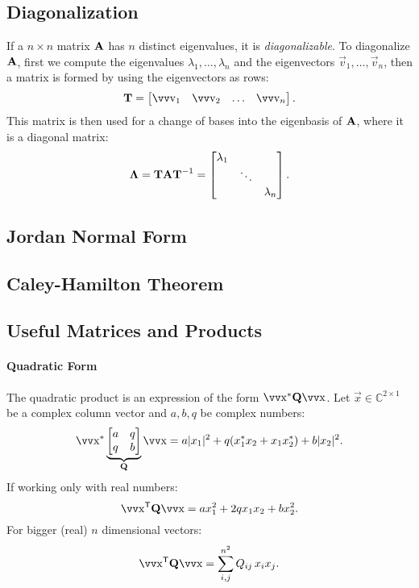 \subsection{Diagonalization}

If a \(n \times n\) matrix \(\bm{\mathrm{A}}\) has \(n\) distinct eigenvalues, it is \emph{diagonalizable}. To diagonalize \(\bm{\mathrm{A}}\), first we compute the eigenvalues \(\lambda_1, \ldots, \lambda_n\) and the eigenvectors \(\vec{v}_1, \ldots, \vec{v}_n\), then a matrix is formed by using the eigenvectors as rows:
\[
	\mx{T} = \begin{bmatrix}
		\vec{v}_1 & \vec{v}_2 & \dots & \vec{v}_n
	\end{bmatrix}.
\]
This matrix is then used for a change of bases into the eigenbasis of \(\bm{\mathrm{A}}\), where it is a diagonal matrix:
\[
	\bm{\mathrm{\Lambda}} = \bm{\mathrm{T}} \bm{\mathrm{A}} \bm{\mathrm{T}}^{-1} = \begin{bmatrix}
		\lambda_1 \\
		& \ddots \\
		& & \lambda_n
	\end{bmatrix}.
\]

\subsection{Jordan Normal Form}

\subsection{Caley-Hamilton Theorem}

\subsection{Useful Matrices and Products}

\paragraph{Quadratic Form}

The quadratic product is an expression of the form \(\vec{x}^* \mx{Q} \vec{x}\). Let \(\vec{x} \in \mathbb{C}^{2\times 1}\) be a complex column vector and \(a, b, q\) be complex numbers:
\[
	\vec{x}^*
	\underbrace{
		\begin{bmatrix}
			a & q \\ q & b
		\end{bmatrix}
	}_{\mx{Q}}
	\vec{x}
	=
	a |x_1|^2 + q(x_1^* x_2 + x_1 x_2^*) + b |x_2|^2.
\]
If working only with real numbers:
\[
	\vec{x}^\mathsf{T} \mx{Q} \vec{x} = a x_1^2 + 2q x_1 x_2 + b x_2^2.
\]
For bigger (real) \(n\) dimensional vectors:
\[
	\vec{x}^\mathsf{T} \mx{Q} \vec{x} = \sum_{i,j}^{n^2} Q_{ij} \, x_i x_j.
\]

